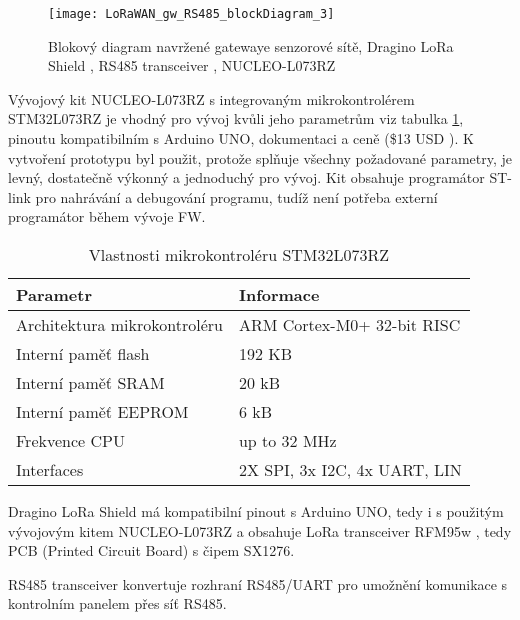 \begin{figure}[!h]
    \centering
    \texttt{[image: LoRaWAN\_gw\_RS485\_blockDiagram\_3]}
    \caption{Blokový diagram navržené gatewaye senzorové sítě, Dragino LoRa Shield \cite{draginoWiki}, RS485 transceiver \cite{rs485tr}, NUCLEO-L073RZ \cite{nucleo-l073RZ_ST}}
    \label{fig:gatewayBlockDiagram}
\end{figure}

Vývojový kit NUCLEO-L073RZ s integrovaným mikrokontrolérem STM32L073RZ je vhodný pro vývoj kvůli jeho parametrům viz tabulka \ref{tab:mcuFeatures}, pinoutu kompatibilním s Arduino UNO, dokumentaci a ceně (\$13 USD \cite{nucleo-l073RZ_ST}). 
K vytvoření prototypu byl použit, protože splňuje všechny požadované parametry, je levný, dostatečně výkonný a jednoduchý pro vývoj. Kit obsahuje programátor ST-link pro nahrávání a debugování programu, tudíž není potřeba externí programátor během vývoje FW.

\begin{longtable}{|l|p{3.5cm}|}
    \caption{Vlastnosti mikrokontroléru STM32L073RZ \cite{nucleo-l073RZ_ST}}
    \label{tab:mcuFeatures} \\
    \hline

    Parametr          & Informace            \\ \hline \hline

    Architektura mikrokontroléru & ARM Cortex-M0+ 32-bit RISC \\ \hline
    Interní paměť flash & 192 KB \\ \hline
    Interní paměť SRAM & 20 kB \\ \hline
    Interní paměť EEPROM & 6 kB \\ \hline
    Frekvence CPU & up to 32 MHz \\ \hline
    Interfaces & 2X SPI, 3x I2C, 4x UART, LIN \\ \hline

\end{longtable}

Dragino LoRa Shield \cite{draginoWiki} má kompatibilní pinout s Arduino UNO, tedy i s použitým vývojovým kitem NUCLEO-L073RZ a obsahuje LoRa transceiver RFM95w \cite{RFM95w}, tedy PCB (Printed Circuit Board) s čipem SX1276. 

RS485 transceiver konvertuje rozhraní RS485/UART pro umožnění komunikace s kontrolním panelem přes síť RS485.


